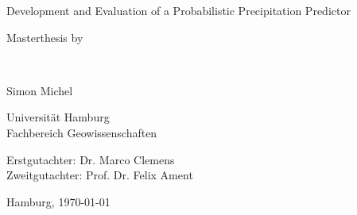 \documentclass[11pt,twoside,a4paper,fleqn]{report}
\numberwithin{equation}{chapter}
\numberwithin{figure}{chapter}
\numberwithin{table}{chapter}
\begin{document}
	\thispagestyle{empty}
	\begin{center}
		\hspace*{0pt}\vfill
		\begin{Huge}
			Development and Evaluation of a Probabilistic Precipitation Predictor
		\end{Huge}
		\vfill
		\begin{minipage}{0.5\textwidth}
			\centering
				\begin{large}
					Masterthesis by
				\end{large}
				\\\vspace{0.5cm}
				\begin{huge}
					Simon Michel
				\end{huge}
		\end{minipage}
		\vfill
		
		\begin{minipage}{0.5\textwidth}
			\centering
				\begin{large}
					Universität Hamburg\\
					Fachbereich Geowissenschaften
				\end{large}
		\end{minipage}
		\vfill
		
		\begin{minipage}{0.5\textwidth}
			\centering
				\begin{large}
					Erstgutachter: Dr. Marco Clemens\\
					Zweitgutachter: Prof. Dr. Felix Ament
				\end{large}
		\end{minipage}
		\vfill
		\begin{minipage}{0.5\textwidth}
			\centering
				\begin{large}
					Hamburg, \today
				\end{large}
		\end{minipage}
		\vfill
	\end{center}
	
\end{document}

